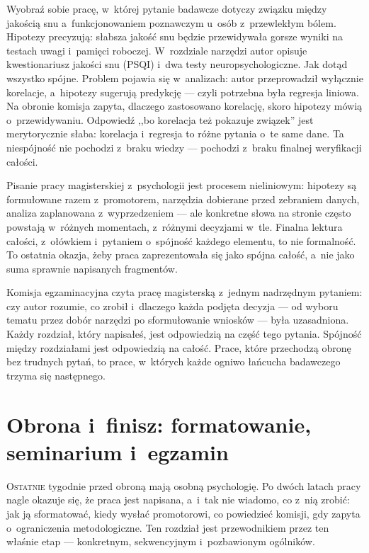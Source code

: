 \documentclass[12pt,a4paper,twoside,openany]{book}
\begin{document}
\begin{examplebox}
Wyobraź sobie pracę, w~której pytanie badawcze dotyczy związku między jakością snu a~funkcjonowaniem poznawczym u~osób z~przewlekłym bólem. Hipotezy precyzują: słabsza jakość snu będzie przewidywała gorsze wyniki na testach uwagi i~pamięci roboczej. W~rozdziale narzędzi autor opisuje kwestionariusz jakości snu (PSQI) i~dwa testy neuropsychologiczne. Jak dotąd wszystko spójne. Problem pojawia się w~analizach: autor przeprowadził wyłącznie korelacje, a~hipotezy sugerują predykcję --- czyli potrzebna była regresja liniowa. Na obronie komisja zapyta, dlaczego zastosowano korelację, skoro hipotezy mówią o~przewidywaniu. Odpowiedź ,,bo korelacja też pokazuje związek'' jest merytorycznie słaba: korelacja i~regresja to różne pytania o~te same dane. Ta niespójność nie pochodzi z~braku wiedzy --- pochodzi z~braku finalnej weryfikacji całości.
\end{examplebox}

Pisanie pracy magisterskiej z~psychologii jest procesem nieliniowym: hipotezy są formułowane razem z~promotorem, narzędzia dobierane przed zebraniem danych, analiza zaplanowana z~wyprzedzeniem --- ale konkretne słowa na stronie często powstają w~różnych momentach, z~różnymi decyzjami w~tle. Finalna lektura całości, z~ołówkiem i~pytaniem o~spójność każdego elementu, to nie formalność. To ostatnia okazja, żeby praca zaprezentowała się jako spójna całość, a~nie jako suma sprawnie napisanych fragmentów.

\begin{keyinsight}
Komisja egzaminacyjna czyta pracę magisterską z~jednym nadrzędnym pytaniem: czy autor rozumie, co zrobił i~dlaczego każda podjęta decyzja --- od wyboru tematu przez dobór narzędzi po sformułowanie wniosków --- była uzasadniona. Każdy rozdział, który napisałeś, jest odpowiedzią na część tego pytania. Spójność między rozdziałami jest odpowiedzią na całość. Prace, które przechodzą obronę bez trudnych pytań, to prace, w~których każde ogniwo łańcucha badawczego trzyma się następnego.
\end{keyinsight}
\clearpage

\chapter{Obrona i~finisz: formatowanie, seminarium i~egzamin}

\lettrine{O}{statnie} tygodnie przed obroną mają osobną psychologię. Po dwóch latach pracy nagle okazuje się, że praca jest napisana, a~i~tak nie wiadomo, co z~nią zrobić: jak ją sformatować, kiedy wysłać promotorowi, co powiedzieć komisji, gdy zapyta o~ograniczenia metodologiczne. Ten rozdział jest przewodnikiem przez ten właśnie etap --- konkretnym, sekwencyjnym i~pozbawionym ogólników.
\end{document}
